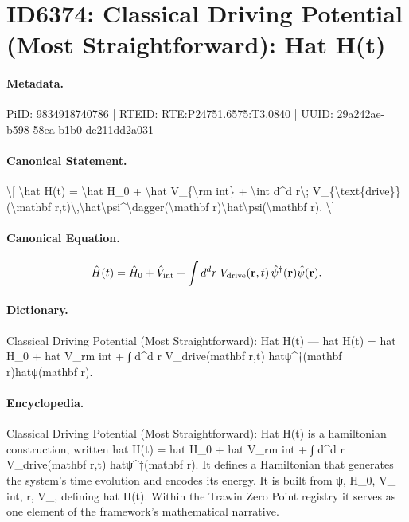 \section*{ID6374: Classical Driving Potential (Most Straightforward): Hat H(t)}
\paragraph{Metadata.}
PiID: 9834918740786 | RTEID: RTE:P24751.6575:T3.0840 | UUID: 29a242ae-b598-58ea-b1b0-de211dd2a031

\paragraph{Canonical Statement.}
\textbackslash{}[ \textbackslash{}hat H(t) = \textbackslash{}hat H\_0 + \textbackslash{}hat V\_\{\textbackslash{}rm int\} + \textbackslash{}int d\textasciicircum{}d r\textbackslash{}; V\_\{\textbackslash{}text\{drive\}\}(\textbackslash{}mathbf r,t)\textbackslash{},\textbackslash{}hat\textbackslash{}psi\textasciicircum{}\textbackslash{}dagger(\textbackslash{}mathbf r)\textbackslash{}hat\textbackslash{}psi(\textbackslash{}mathbf r). \textbackslash{}]

\paragraph{Canonical Equation.}
\[
\hat H(t) = \hat H_0 + \hat V_{\rm int} + \int d^d r\; V_{\text{drive}}(\mathbf r,t)\,\hat\psi^\dagger(\mathbf r)\hat\psi(\mathbf r).
\]

\paragraph{Dictionary.}
Classical Driving Potential (Most Straightforward): Hat H(t) — hat H(t) = hat H\_0 + hat V\_rm int + ∫ d\textasciicircum{}d r V\_drive(mathbf r,t) hatψ\textasciicircum{}†(mathbf r)hatψ(mathbf r).

\paragraph{Encyclopedia.}
Classical Driving Potential (Most Straightforward): Hat H(t) is a hamiltonian construction, written hat H(t) = hat H\_0 + hat V\_rm int + ∫ d\textasciicircum{}d r V\_drive(mathbf r,t) hatψ\textasciicircum{}†(mathbf r). It defines a Hamiltonian that generates the system's time evolution and encodes its energy. It is built from ψ, H\_0, V\_ int, r, V\_, defining hat H(t). Within the Trawin Zero Point registry it serves as one element of the framework's mathematical narrative.

